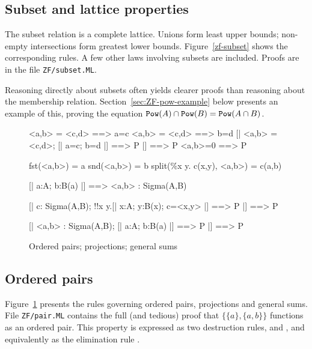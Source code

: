 \subsection{Subset and lattice properties}
The subset relation is a complete lattice.  Unions form least upper bounds;
non-empty intersections form greatest lower bounds.  Figure~\ref{zf-subset}
shows the corresponding rules.  A few other laws involving subsets are
included.  Proofs are in the file \texttt{ZF/subset.ML}.

Reasoning directly about subsets often yields clearer proofs than
reasoning about the membership relation.  Section~\ref{sec:ZF-pow-example}
below presents an example of this, proving the equation ${{\tt Pow}(A)\cap
  {\tt Pow}(B)}= {\tt Pow}(A\cap B)$.


\begin{figure}
\begin{ttbox}
    <a,b> = <c,d> ==> a=c
    <a,b> = <c,d> ==> b=d
     [| <a,b> = <c,d>;  [| a=c; b=d |] ==> P |] ==> P
      <a,b>=0 ==> P

        fst(<a,b>) = a
        snd(<a,b>) = b
           split(\%x y. c(x,y), <a,b>) = c(a,b)

          [| a:A;  b:B(a) |] ==> <a,b> : Sigma(A,B)

          [| c: Sigma(A,B);  
                   !!x y.[| x:A; y:B(x); c=<x,y> |] ==> P |] ==> P

         [| <a,b> : Sigma(A,B);    
                   [| a:A;  b:B(a) |] ==> P   |] ==> P
\end{ttbox}
\caption{Ordered pairs; projections; general sums} \label{zf-pair}
\end{figure}


\subsection{Ordered pairs} \label{sec:pairs}

Figure~\ref{zf-pair} presents the rules governing ordered pairs,
projections and general sums.  File \texttt{ZF/pair.ML} contains the
full (and tedious) proof that $\{\{a\},\{a,b\}\}$ functions as an ordered
pair.  This property is expressed as two destruction rules,
 and , and equivalently
as the elimination rule .

